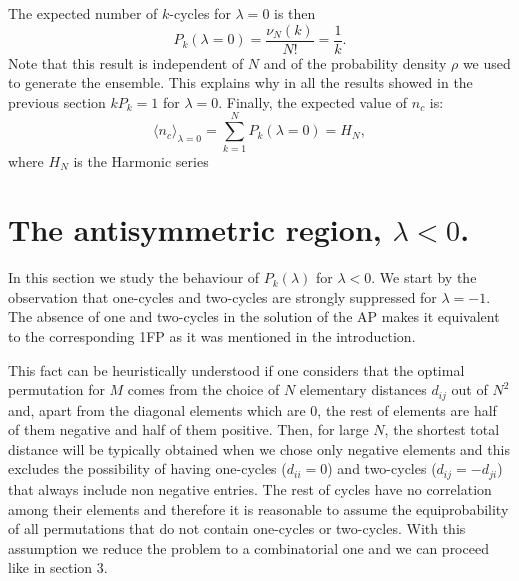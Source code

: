 \documentclass[]{iopart}
\begin{document}
The expected number of $k$-cycles for
$\lambda=0$ is then
$$P_k(\lambda=0)=\frac{\nu_N(k)}{N!}=\frac1k.$$
Note that this result is independent of $N$ and of the probability 
density $\rho$ we used to generate the ensemble. 
This explains why in all the results
showed in the previous section $kP_k=1$ for $\lambda=0$. Finally,
 the expected value of
$n_c$ is:
\begin{equation}
\langle n_c\rangle_{\lambda = 0}=\sum_{k=1}^N P_k(\lambda=0)=H_N,
\end{equation}
where $H_N$ is the Harmonic series


\section{The antisymmetric region, $\lambda<0$.}

In this section we study the behaviour
of $P_k(\lambda)$  for $\lambda<0$. We start by the observation
that one-cycles and two-cycles are strongly suppressed
for $\lambda=-1$. The absence of one and two-cycles in the 
solution of the AP makes it equivalent to the corresponding 
1FP as it was mentioned in the introduction. 

This fact can be heuristically understood if one considers that 
the optimal permutation for $M$ comes from the choice 
of $N$ elementary distances $d_{ij}$ out of $N^2$ and, apart from the 
diagonal elements which are $0$, the rest of elements are half of them negative
and half of them positive.
Then, for large $N$, the shortest total distance will be typically
obtained when we chose only negative elements and this excludes
the possibility of having one-cycles ($d_{{i}{i}}=0$)
and two-cycles ($d_{{i}{j}}=-d_{{j}{i}}$) that always include 
non negative entries.
The rest of cycles have no correlation
among their elements and therefore it is
reasonable to assume the equiprobability of all
permutations that do not contain one-cycles or 
two-cycles. With this assumption we reduce the problem to a combinatorial
one and we can proceed like in section 3.
\end{document}
